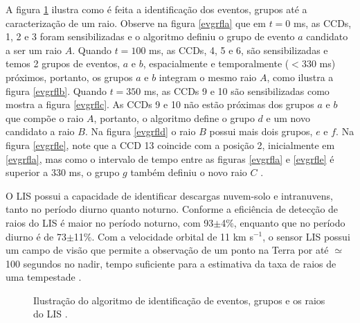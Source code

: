 A figura \ref{LisImagemProcessa} ilustra como é feita a identificação dos  eventos, grupos até a caracterização de um raio. Observe na figura \ref{evgrfla} que em $t=0$ ms, as CCDs, 1, 2 e 3  foram sensibilizadas e o algoritmo definiu o grupo de evento $a$ candidato a ser um raio $A$.  Quando $t=100$ ms, as CCDs, 4, 5 e 6, são sensibilizadas e temos 2 grupos de eventos, $a$ e $b$, espacialmente e temporalmente ($<$330 ms) próximos, portanto, os grupos $a$ e $b$ integram o mesmo raio $A$, como ilustra a figura \ref{evgrflb}. Quando $t = 350$ ms, as CCDs 9 e 10 são sensibilizadas como mostra a figura \ref{evgrflc}. As CCDs 9 e 10 não estão próximas dos grupos $a$ e $b$ que compõe o raio $A$, portanto, o algoritmo define o grupo $d$ e um novo candidato a raio $B$. Na figura \ref{evgrfld} o raio $B$ possui mais dois grupos, $e$ e $f$. Na figura \ref{evgrfle}, note que a CCD 13 coincide com a posição 2, inicialmente em \ref{evgrfla}, mas como o intervalo de tempo entre as figuras \ref{evgrfla} e \ref{evgrfle} é superior a 330 ms, o grupo $g$ também definiu o novo raio $C$ \cite{christian2000LISalgorithm}.  

     
O LIS possui a capacidade de identificar descargas nuvem-solo e intranuvens, tanto no período diurno quanto noturno. Conforme  a eficiência de detecção de raios do LIS é maior no período noturno, com 93$\pm$4\%, enquanto que no período diurno é de 73$\pm$11\%.  Com a velocidade orbital de 11 km s$^{-1}$, o sensor LIS possui um campo de visão que permite a observação de um ponto na Terra por até $\simeq$100 segundos no nadir, tempo suficiente para a estimativa da taxa de raios de uma tempestade \cite{christianTM,trmmhandbook}.


\begin{figure}[!ht]
\caption{Ilustração do algoritmo de identificação de eventos, grupos e os raios do LIS \cite{christian2000LISalgorithm}.}
\label{LisImagemProcessa} 
\end{figure} 



